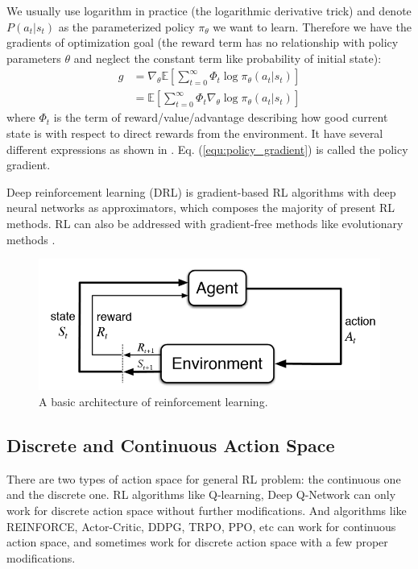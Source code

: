 \documentclass{article}
\begin{document}
We usually use logarithm in practice (the logarithmic derivative trick) and denote $P(a_{t}|s_{t})$ as the parameterized policy $\pi_\theta$ we want to learn. Therefore we have the gradients of optimization goal (the reward term has no relationship with policy parameters $\theta$ and neglect the constant term like probability of initial state):
\begin{equation}
\begin{aligned}
\label{equ:policy_gradient}
    g&=\nabla_\theta \mathbb{E}[\sum_{t=0}^\infty \Phi_t \log \pi_\theta(a_t|s_t)]\\
    &=\mathbb{E}[\sum_{t=0}^\infty \Phi_t \nabla_\theta \log \pi_\theta(a_t|s_t)]
\end{aligned}
\end{equation}
where $\Phi_t$ is the term of reward/value/advantage describing how good current state is with respect to direct rewards from the environment. It have several different expressions as shown in \cite{schulman2015high}. 
Eq. (\ref{equ:policy_gradient}) is called the policy gradient.

Deep reinforcement learning (DRL) \cite{arulkumaran2017deep} is gradient-based RL algorithms with deep neural networks as approximators, which composes the majority of present RL methods. RL can also be addressed with gradient-free methods like evolutionary methods \cite{koutnik2013evolving}.

\begin{figure}[htbp]
	\centering
	\includegraphics[scale=0.4]{img/rl.png}
	\caption{A basic architecture of reinforcement learning.}
	\label{fig:rl0}
\end{figure}
\subsection{Discrete and Continuous Action Space}
There are two types of action space for general RL problem: the continuous one and the discrete one. RL algorithms like Q-learning, Deep Q-Network can only work for discrete action space without further modifications. And algorithms like REINFORCE, Actor-Critic, DDPG, TRPO, PPO, etc can work for continuous action space, and sometimes work for discrete action space with a few proper modifications.
\end{document}
